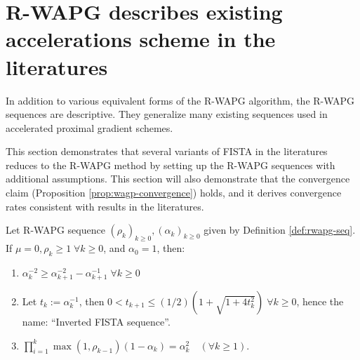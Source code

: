 \documentclass[12pt]{article}
\begin{document}
\section{R-WAPG describes existing accelerations scheme in the literatures}\label{sec:rwapg-literatures}
    In addition to various equivalent forms of the R-WAPG algorithm, the R-WAPG sequences are descriptive. 
    They generalize many existing sequences used in accelerated proximal gradient schemes. 
    \par
    This section demonstrates that several variants of FISTA in the literatures reduces to the R-WAPG method by setting up the R-WAPG sequences with additional assumptions. 
    This section will also demonstrate that the convergence claim (Proposition \ref{prop:wagp-convergence}) holds, and it derives convergence rates consistent with results in the literatures.  
    \begin{lemma}\label{lemma:inverted-fista-seq}
        Let R-WAPG sequence $(\rho_k)_{k \ge 0}, (\alpha_k)_{k \ge 0}$ given by Definition \ref{def:rwapg-seq}. 
        If $\mu = 0, \rho_k \ge 1\; \forall k \ge 0$, and $\alpha_0 = 1$, then: 
        \begin{enumerate}
            \item $\alpha_k^{-2} \ge \alpha_{k + 1}^{-2} - \alpha_{k + 1}^{-1}\; \forall k \ge 0$
            \item Let $t_k := \alpha_k^{-1}$, then $0 < t_{k + 1} \le (1/2)\left(1 + \sqrt{1 + 4t_k^2}\right)\;\forall k\ge 0$, hence the name: ``Inverted FISTA sequence''. 
            \item $\prod_{i = 1}^k\max(1, \rho_{k - 1})(1 - \alpha_k) = \alpha_k^2 \quad (\forall k \ge 1)$. 
        \end{enumerate}
    \end{lemma}
\end{document}
